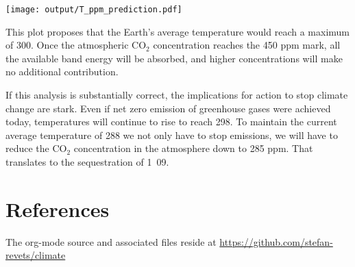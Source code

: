 \documentclass[10pt,a4paper,titlepage]{article}
\begin{document}
\texttt{[image: output/T\_ppm\_prediction.pdf]}

This plot proposes that the Earth's average temperature would reach a
maximum of \unit{300}{\kelvin}. Once the atmospheric CO$_{\text{2}}$
concentration reaches the 450 ppm mark, all the available band energy
will be absorbed, and higher concentrations will make no additional
contribution.

If this analysis is substantially correct, the implications for action
to stop climate change are stark. Even if net zero emission of
greenhouse gases were achieved today, temperatures will continue to
rise to reach \unit{298}{\kelvin}. To maintain the current average
temperature of \unit{288}{\kelvin} we not only have to stop emissions,
we will have to reduce the CO$_{\text{2}}$ concentration in the atmosphere down
to 285 ppm. That translates to the sequestration of
\unit{1.09}{\petad\kilogram}.

\section{References}
\label{sec-4}
The org-mode source and associated files reside at \url{https://github.com/stefan-revets/climate}



\end{document}
